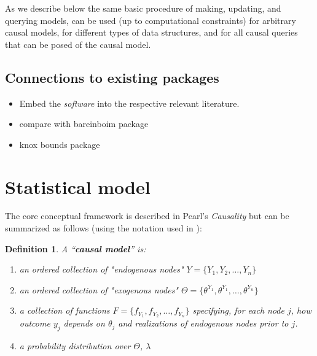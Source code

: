 \documentclass[
  11pt,
  article]{jss}
\newtheorem{definition}{Definition}
\begin{document}
As we describe below the same basic procedure of making, updating, and
querying models, can be used (up to computational constraints) for
arbitrary causal models, for different types of data structures, and for
all causal queries that can be posed of the causal model.

\hypertarget{connections-to-existing-packages}{%
\subsection{Connections to existing
packages}\label{connections-to-existing-packages}}

\begin{itemize}
\item
  Embed the \emph{software} into the respective relevant literature.
\item
  compare with bareinboim package
\item
  knox bounds package
\end{itemize}

\hypertarget{statistical-model}{%
\section{Statistical model}\label{statistical-model}}

The core conceptual framework is described in Pearl's \emph{Causality}
\citep{pearl2009causality} but can be summarized as follows (using the
notation used in \citet{ii2023}):

\begin{definition}
  
  A ``\textbf{causal model}'' is:
  \begin{enumerate}
    \item an ordered collection of "endogenous nodes" $Y = \{Y_1, Y_2, \dots, Y_n\}$
    \item an ordered collection of "exogenous nodes" $\Theta = \{\theta^{Y_1}, \theta^{Y_1}, \dots, \theta^{Y_n}\}$
    \item a collection of functions $F = \{f_{Y_1}, f_{Y_2}, \dots, f_{Y_n}\}$ specifying, for each node $j$, how outcome $y_j$ depends on $\theta_j$ and realizations of endogenous nodes prior to $j$.
    \item a probability distribution over $\Theta$, $\lambda$
  \end{enumerate}
  
\end{definition}
\end{document}
